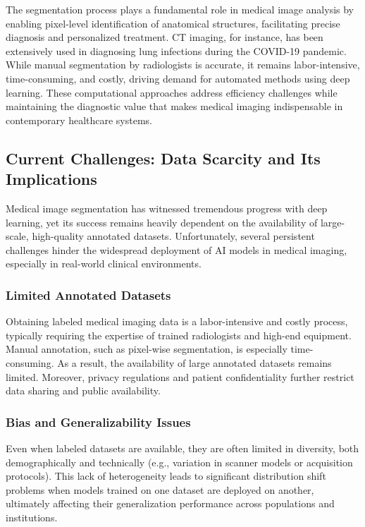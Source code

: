 \documentclass{article}
\begin{document}
The segmentation process plays a fundamental role in medical image analysis by enabling pixel-level identification of anatomical structures, facilitating precise diagnosis and personalized treatment\cite{kumarTripleClippedHistogramBased2021}. CT imaging, for instance, has been extensively used in diagnosing lung infections during the COVID-19 pandemic\cite{LIU2020244,9446143,YI2019101552}. While manual segmentation by radiologists is accurate, it remains labor-intensive, time-consuming, and costly, driving demand for automated methods using deep learning\cite{TAJBAKHSH2020101693}. These computational approaches address efficiency challenges while maintaining the diagnostic value that makes medical imaging indispensable in contemporary healthcare systems.

\subsection{Current Challenges: Data Scarcity and Its Implications}
Medical image segmentation has witnessed tremendous progress with deep learning, yet its success remains heavily dependent on the availability of large-scale, high-quality annotated datasets. Unfortunately, several persistent challenges hinder the widespread deployment of AI models in medical imaging, especially in real-world clinical environments.

\subsubsection{Limited Annotated Datasets}
Obtaining labeled medical imaging data is a labor-intensive and costly process, typically requiring the expertise of trained radiologists and high-end equipment. Manual annotation, such as pixel-wise segmentation, is especially time-consuming. As a result, the availability of large annotated datasets remains limited​. Moreover, privacy regulations and patient confidentiality further restrict data sharing and public availability​\cite{TAJBAKHSH2020101693}.

\subsubsection{Bias and Generalizability Issues}
Even when labeled datasets are available, they are often limited in diversity, both demographically and technically (e.g., variation in scanner models or acquisition protocols). This lack of heterogeneity leads to significant distribution shift problems when models trained on one dataset are deployed on another, ultimately affecting their generalization performance across populations and institutions​.
\end{document}
